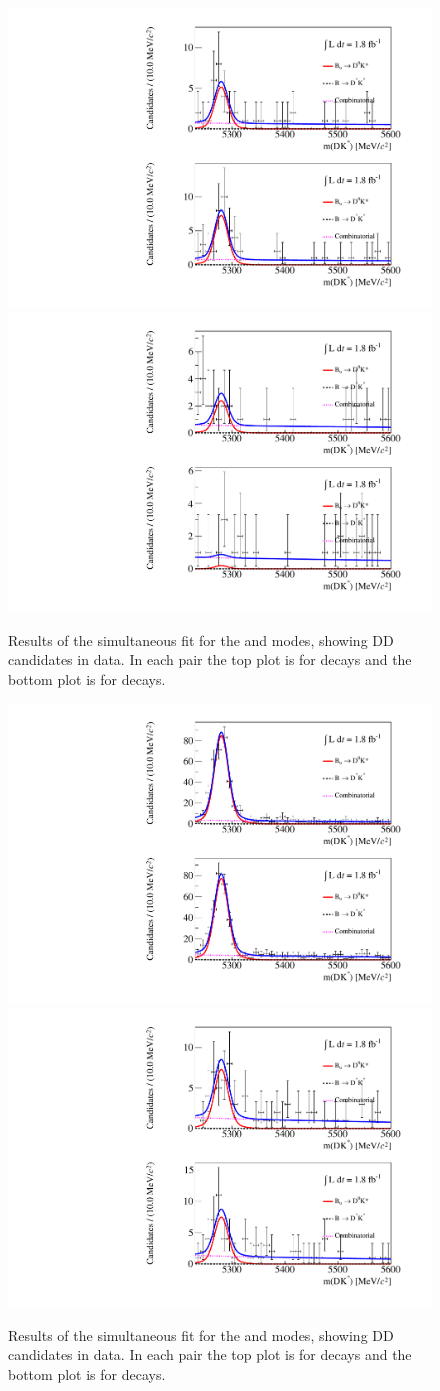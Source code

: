 \begin{figure}
\includegraphics[width=0.5\linewidth]{figures/results/canvas_d2pipi_DD_run2.pdf}
\includegraphics[width=0.5\linewidth]{figures/results/canvas_d2pik_DD_run2.pdf}
\caption{Results of the simultaneous fit for the \pipi and \pik modes, showing DD candidates in \runtwo data. In each pair the top plot is for \Bp decays and the bottom plot is for \Bm decays.}
\label{resultspipi}
\end{figure}

\begin{figure}
\includegraphics[width=0.5\linewidth]{figures/results/canvas_d2kpipipi_DD_run2.pdf}
\includegraphics[width=0.5\linewidth]{figures/results/canvas_d2pipipipi_DD_run2.pdf}
\caption{Results of the simultaneous fit for the \kpipipi and \pipipipi modes, showing DD candidates in \runtwo data. In each pair the top plot is for \Bp decays and the bottom plot is for \Bm decays.}
\label{resultskpipipi}
\end{figure}

